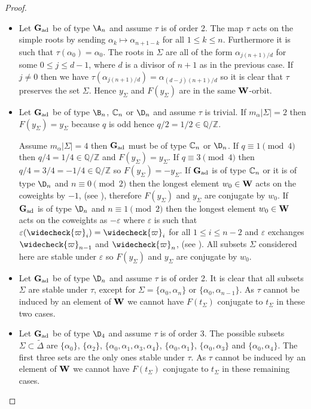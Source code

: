 \documentclass[eqthmnum]{jt-calcs}
\renewcommand{\epsilon}{\varepsilon}
\begin{document}
\begin{proof}
\begin{itemize}
	\item Let $\mathbf{G}_{\operatorname{ad}}$ be of type $\A_n$ and assume $\tau$ is of order 2. The map $\tau$ acts on the simple roots by sending $\alpha_k \mapsto \alpha_{n+1-k}$ for all $1 \leqslant k \leqslant n$. Furthermore it is such that $\tau(\alpha_0) = \alpha_0$. The roots in $\Sigma$ are all of the form $\alpha_{j(n+1)/d}$ for some $0 \leqslant j \leqslant d-1$, where $d$ is a divisor of $n+1$ as in the previous case. If $j \neq 0$ then we have $\tau(\alpha_{j(n+1)/d}) = \alpha_{(d-j)(n+1)/d}$ so it is clear that $\tau$ preserves the set $\Sigma$. Hence $y_{\Sigma}$ and $F(y_{\Sigma})$ are in the same $\mathbf{W}$-orbit.
	
	\item Let $\mathbf{G}_{\operatorname{ad}}$ be of type $\B_n$, ${\mathbb C}_n$ or $\D_n$ and assume $\tau$ is trivial. If $m_{\alpha}|\Sigma| = 2$ then $F(y_{\Sigma}) = y_{\Sigma}$ because $q$ is odd hence $q/2 = 1/2 \in \mathbb{Q/Z}$.
	
	Assume $m_{\alpha}|\Sigma| =4$ then $\mathbf{G}_{\operatorname{ad}}$ must be of type ${\mathbb C}_n$ or $\D_n$. If $q \equiv 1 \pmod{4}$ then $q/4 = 1/4 \in \mathbb{Q/Z}$ and $F(y_{\Sigma}) = y_{\Sigma}$. If $q \equiv 3 \pmod{4}$ then $q/4 = 3/4 = -1/4 \in \mathbb{Q/Z}$ so $F(y_{\Sigma}) = -y_{\Sigma}$. If $\mathbf{G}_{\operatorname{ad}}$ is of type ${\mathbb C}_n$ or it is of type $\D_n$ and $n \equiv 0 \pmod{2}$ then the longest element $w_0 \in \mathbf{W}$ acts on the coweights by $-1$, (see \cite[Plates II - IV (XI)]{bourbaki:2002:lie-groups-chap-4-6}), therefore $F(y_{\Sigma})$ and $y_{\Sigma}$ are conjugate by $w_0$. If $\mathbf{G}_{\operatorname{ad}}$ is of type $\D_n$ and $n \equiv 1\pmod{2}$ then the longest element $w_0 \in \mathbf{W}$ acts on the coweights as $-\epsilon$ where $\epsilon$ is such that $\varepsilon(\widecheck{\varpi}_i) = \widecheck{\varpi}_i$ for all $1 \leqslant i \leqslant n-2$ and $\varepsilon$ exchanges $\widecheck{\varpi}_{n-1}$ and $\widecheck{\varpi}_n$, (see \cite[Plate IV (XI)]{bourbaki:2002:lie-groups-chap-4-6}). All subsets $\Sigma$ considered here are stable under $\epsilon$ so $F(y_{\Sigma})$ and $y_{\Sigma}$ are conjugate by $w_0$.
	
	\item Let $\mathbf{G}_{\operatorname{ad}}$ be of type $\D_n$ and assume $\tau$ is of order 2. It is clear that all subsets $\Sigma$ are stable under $\tau$, except for $\Sigma = \{\alpha_0,\alpha_n\}$ or $\{\alpha_0,\alpha_{n-1}\}$. As $\tau$ cannot be induced by an element of $\mathbf{W}$ we cannot have $F(t_{\Sigma})$ conjugate to $t_{\Sigma}$ in these two cases.
	
	\item Let $\mathbf{G}_{\operatorname{ad}}$ be of type $\D_4$ and assume $\tau$ is of order 3. The possible subsets $\Sigma \subset \tilde{\Delta}$ are $\{\alpha_0\}$, $\{\alpha_2\}$, $\{\alpha_0,\alpha_1,\alpha_3,\alpha_4\}$, $\{\alpha_0,\alpha_1\}$, $\{\alpha_0,\alpha_3\}$ and $\{\alpha_0,\alpha_4\}$. The first three sets are the only ones stable under $\tau$. As $\tau$ cannot be induced by an element of $\mathbf{W}$ we cannot have $F(t_{\Sigma})$ conjugate to $t_{\Sigma}$ in these remaining cases.
\end{itemize}
\end{proof}
\end{document}
